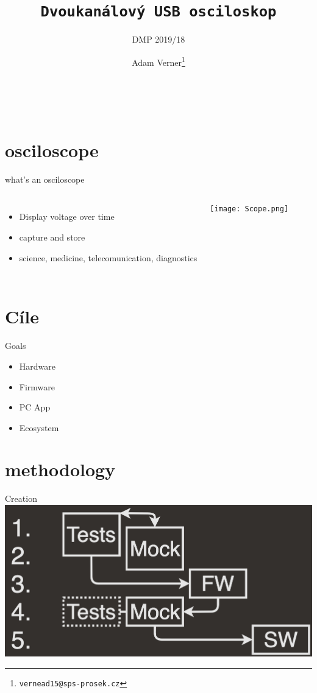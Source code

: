 \documentclass{beamer}
\title{\texttt{\LARGE Dvoukanálový USB osciloskop}}
\subtitle{ DMP 2019/18 }
\author{ Adam Verner\footnote{\texttt{vernead15@sps-prosek.cz}}}
\begin{document}
\begin{frame}
	\maketitle \\
\end{frame}

\section{osciloscope}

	\begin{frame}{what's an osciloscope}
	\begin{columns}[onlytextwidth,T]
		\column{\dimexpr\linewidth-30mm-5mm}
			\begin{itemize}
				\item Display voltage over time
				\item capture and store
				\item science, medicine, telecomunication, diagnostics
			\end{itemize}

			\column{30mm}
			\texttt{[image: Scope.png]}
	    \end{columns}
	\end{frame}
	
\section{Cíle}

	\begin{frame}{Goals}
		\begin{itemize}
			\item Hardware
			\item Firmware
			\item PC App
			\item Ecosystem
		\end{itemize}
	\end{frame}

\section{methodology}

	\begin{frame}{Creation}
		\includegraphics[width=0.9\paperwidth]{Iterations.png}
	\end{frame}
\end{document}
